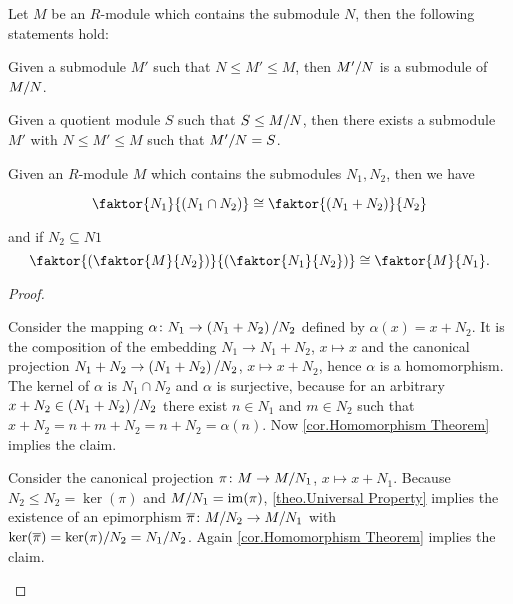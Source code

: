 \begin{cor}
Let $M$ be an $R$-module which contains the submodule $N$, then the following statements hold:
\begin{thmlist}
\item Given a submodule $M'$ such that $N\leq M'\leq M$, then $\nicefrac{M'}{N}$ is a submodule of $\MtN$.
\item Given a quotient module $S$ such that $S\leq\MtN$, then there exists a submodule $M'$ with $N\leq M'\leq M$ such that $\nicefrac{M'}{N}=S$.
\end{thmlist}
\end{cor}

\begin{cor}
Given an $R$-module $M$ which contains the submodules $N_1,N_2$, then we have
\begin{thmlist}
\item $$\faktor{N_1}{\left(N_1\cap N_2\right)}\cong\faktor{\left(N_1+N_2\right)}{N_2}$$
\item and if $N_2\subseteq N1$ $$\faktor{\left(\faktor{M}{N_2}\right)}{\left(\faktor{N_1}{N_2}\right)}\cong\faktor{M}{N_1}.$$
\end{thmlist}
\end{cor}
\begin{proof}
\begin{plist}
\item Consider the mapping $\alpha\colon N_1\to \nicefrac{\left(N_1+N_2\right)}{N_2}$ def\-ined by $\alpha(x)=x+N_2$. It is the composition of the embedding $N_1\to N_1+N_2$, $x\mapsto x$ and the canonical projection $N_1+N_2\to\nicefrac{\left(N_1+N_2\right)}{N_2}$, $x\mapsto x+N_2$, hence $\alpha$ is a homomorphism. The kernel of $\alpha$ is $N_1\cap N_2$ and $\alpha$ is surjective, because for an arbitrary $x+N_2\in\nicefrac{\left(N_1+N_2\right)}{N_2}$ there exist $n\in N_1$ and $m\in N_2$ such that $x+N_2=n+m+N_2=n+N_2=\alpha(n)$. Now \cref{cor.Homomorphism Theorem} implies the claim. 
\item Consider the canonical projection $\pi\colon M\to \nicefrac{M}{N_1}$, $x\mapsto x+N_1$. Because $N_2\leq N_2=\ker(\pi)$ and $\nicefrac{M}{N_1}=\im(\pi)$, \cref{theo.Universal Property} implies the existence of an epimorphism $\overline{\pi}\colon \nicefrac{M}{N_2}\to\nicefrac{M}{N_1}$ with $\ker(\overline{\pi})=\nicefrac{\ker(\pi)}{N_2}=\nicefrac{N_1}{N_2}$. Again \cref{cor.Homomorphism Theorem} implies the claim.
\end{plist}
\end{proof}